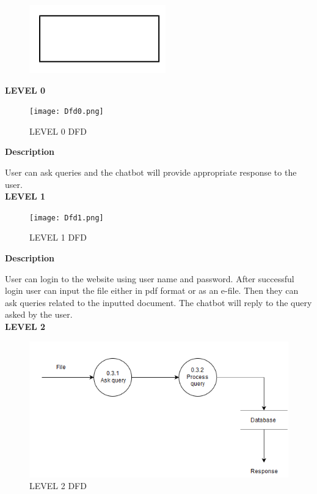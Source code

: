 \documentclass[12pt,a4paper,oneside]{report}
\begin{document}
 \begin{figure}[h]
   	\begin{center}
   	
   	
   		\includegraphics[width=3 in,height=1 in]{ex.png}
   			\end{center}
   \end{figure}

\textbf{LEVEL 0}

\begin{figure}[h]
  	\begin{center}
  		\texttt{[image: Dfd0.png]}
  			\caption{LEVEL 0 DFD}
  			\label{LEVEL 0 DFD}
  	\end{center}
  \end{figure}
  \textbf{Description}
  \\
  \par User can ask queries and the chatbot will provide appropriate response to the user.\\
  \newpage
  \textbf{LEVEL 1}
  
  \begin{figure}[h]
    	\begin{center}
    		\texttt{[image: Dfd1.png]}
    			\caption{LEVEL 1 DFD}
    			\label{LEVEL 1 DFD}
    	\end{center}
    \end{figure}
    
    \textbf{Description}
    \\
    \par User can login to the website using user name and password. After successful login user
    can input the file either in pdf format or as an e-file. Then they can ask queries related to the
    inputted document. The chatbot will reply to the query asked by the user.\\
    
    \textbf{LEVEL 2}
      
      \begin{figure}[h]
        	\begin{center}
        		\includegraphics[width=5 in,height=2.5 in]{Dfd2.png}
        			\caption{LEVEL 2 DFD}
        			\label{LEVEL 2 DFD}
        	\end{center}
        \end{figure}
        
\end{document}
